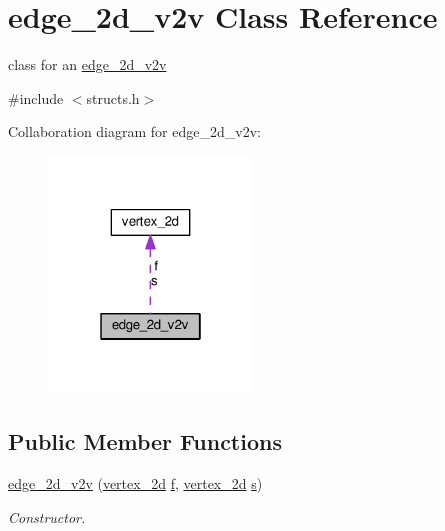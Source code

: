 \hypertarget{classedge__2d__v2v}{}\section{edge\+\_\+2d\+\_\+v2v Class Reference}
\label{classedge__2d__v2v}


class for an \hyperlink{classedge__2d__v2v}{edge\+\_\+2d\+\_\+v2v}  




{\ttfamily \#include $<$structs.\+h$>$}



Collaboration diagram for edge\+\_\+2d\+\_\+v2v\+:
\nopagebreak
\begin{figure}[H]
\begin{center}
\leavevmode
\includegraphics[width=154pt]{classedge__2d__v2v__coll__graph}
\end{center}
\end{figure}
\subsection*{Public Member Functions}
\begin{DoxyCompactItemize}
\item 
\hyperlink{classedge__2d__v2v_a47d30867a13efb336c942cb1a7d5703a}{edge\+\_\+2d\+\_\+v2v} (\hyperlink{classvertex__2d}{vertex\+\_\+2d} \hyperlink{classedge__2d__v2v_a329f701b47c323a9d200b62b208bf4c9}{f}, \hyperlink{classvertex__2d}{vertex\+\_\+2d} \hyperlink{classedge__2d__v2v_af2a0304bd993964329335adf6a574302}{s})
\begin{DoxyCompactList}\small\item\em Constructor. \end{DoxyCompactList}\end{DoxyCompactItemize}
